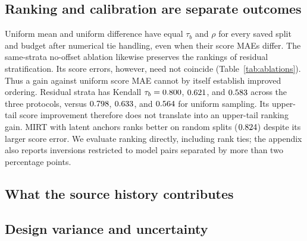 \documentclass{article}
\begin{document}
\subsection{Ranking and calibration are separate outcomes}
\begin{table}[t]
\centering\small
\caption{Kendall $\tau_b$ at $k=100$, with the same macro and bootstrap convention as Table~\ref{tab:main}. Uniform mean and uniform difference have identical rankings, as Equation~\eqref{eq:rank_identity} predicts. Spearman correlations and pairwise errors appear in the appendix.}
\label{tab:ranking}

\end{table}
Uniform mean and uniform difference have equal $\tau_b$ and $\rho$ for every saved split and budget after numerical tie handling, even when their score MAEs differ. The same-strata no-offset ablation likewise preserves the rankings of residual stratification. Its score errors, however, need not coincide (Table~\ref{tab:ablations}). Thus a gain against uniform score MAE cannot by itself establish improved ordering. Residual strata has Kendall $\tau_b=0.800$, $0.621$, and $0.583$ across the three protocols, versus $0.798$, $0.633$, and $0.564$ for uniform sampling. Its upper-tail score improvement therefore does not translate into an upper-tail ranking gain. MIRT with latent anchors ranks better on random splits ($0.824$) despite its larger score error. We evaluate ranking directly, including rank ties; the appendix also reports inversions restricted to model pairs separated by more than two percentage points.

\subsection{What the source history contributes}
\begin{table}[t]
\centering\small
\caption{Calibration and selection controls at $k=100$. ``Same strata, no offset'' is an exploratory ablation with exactly the proposed method's samples, weights, and counts. Raw-response strata instead changes the clustering as well as removing the offset.}
\label{tab:ablations}

\end{table}


\subsection{Design variance and uncertainty}

\end{document}

